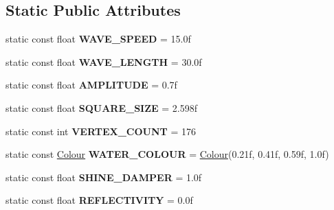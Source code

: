 \subsection*{Static Public Attributes}
\begin{DoxyCompactItemize}
\item 
\mbox{\label{class_flounder_1_1_water_ad1216593446e73c1968265655b815317}} 
static const float {\bfseries W\+A\+V\+E\+\_\+\+S\+P\+E\+ED} = 15.\+0f
\item 
\mbox{\label{class_flounder_1_1_water_aa3d1404e6485d99471cbc313a7acddb3}} 
static const float {\bfseries W\+A\+V\+E\+\_\+\+L\+E\+N\+G\+TH} = 30.\+0f
\item 
\mbox{\label{class_flounder_1_1_water_a3599e62182901f142ba12b1855ef9d23}} 
static const float {\bfseries A\+M\+P\+L\+I\+T\+U\+DE} = 0.\+7f
\item 
\mbox{\label{class_flounder_1_1_water_a5b8032c241e141b7360eccd080405176}} 
static const float {\bfseries S\+Q\+U\+A\+R\+E\+\_\+\+S\+I\+ZE} = 2.\+598f
\item 
\mbox{\label{class_flounder_1_1_water_a69ae838914a71f671aba3e5083b5e3ad}} 
static const int {\bfseries V\+E\+R\+T\+E\+X\+\_\+\+C\+O\+U\+NT} = 176
\item 
\mbox{\label{class_flounder_1_1_water_a5a7078166d69cdbf899550ac0530b643}} 
static const \hyperlink{class_flounder_1_1_colour}{Colour} {\bfseries W\+A\+T\+E\+R\+\_\+\+C\+O\+L\+O\+UR} = \hyperlink{class_flounder_1_1_colour}{Colour}(0.\+21f, 0.\+41f, 0.\+59f, 1.\+0f)
\item 
\mbox{\label{class_flounder_1_1_water_a9dc030f2320d7eba99f99f8acf55af3e}} 
static const float {\bfseries S\+H\+I\+N\+E\+\_\+\+D\+A\+M\+P\+ER} = 1.\+0f
\item 
\mbox{\label{class_flounder_1_1_water_a14c5029262885f113f4c5dcdb3326dba}} 
static const float {\bfseries R\+E\+F\+L\+E\+C\+T\+I\+V\+I\+TY} = 0.\+0f
\end{DoxyCompactItemize}

